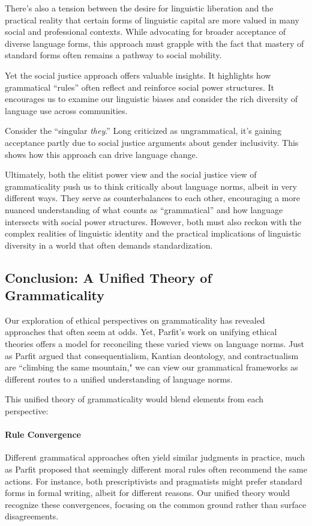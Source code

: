 There's also a tension between the desire for linguistic liberation and the practical reality that certain forms of linguistic capital are more valued in many social and professional contexts. While advocating for broader acceptance of diverse language forms, this approach must grapple with the fact that mastery of standard forms often remains a pathway to social mobility.

Yet the social justice approach offers valuable insights. It highlights how grammatical ``rules'' often reflect and reinforce social power structures. It encourages us to examine our linguistic biases and consider the rich diversity of language use across communities.

Consider the ``singular \textit{they}.'' Long criticized as ungrammatical, it's gaining acceptance partly due to social justice arguments about gender inclusivity. This shows how this approach can drive language change.

Ultimately, both the elitist power view and the social justice view of grammaticality push us to think critically about language norms, albeit in very different ways. They serve as counterbalances to each other, encouraging a more nuanced understanding of what counts as ``grammatical'' and how language intersects with social power structures. However, both must also reckon with the complex realities of linguistic identity and the practical implications of linguistic diversity in a world that often demands standardization.

\subsection{Conclusion: A Unified Theory of Grammaticality}

Our exploration of ethical perspectives on grammaticality has revealed approaches that often seem at odds. Yet, Parfit's work on unifying ethical theories offers a model for reconciling these varied views on language norms. Just as Parfit argued that consequentialism, Kantian deontology, and contractualism are ``climbing the same mountain," we can view our grammatical frameworks as different routes to a unified understanding of language norms.

This unified theory of grammaticality would blend elements from each perspective:

\paragraph{Rule Convergence} Different grammatical approaches often yield similar judgments in practice, much as Parfit proposed that seemingly different moral rules often recommend the same actions. For instance, both prescriptivists and pragmatists might prefer standard forms in formal writing, albeit for different reasons. Our unified theory would recognize these convergences, focusing on the common ground rather than surface disagreements.

